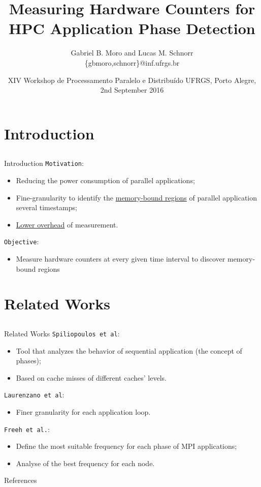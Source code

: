 \documentclass[12pt,xcolor=dvipsnames,presentation,handout]{beamer}
\institute{
\texttt{[image: img/gppd.png]}
\hfill
\texttt{[image: img/inf.pdf]}
\hfill
\texttt{[image: img/ufrgs.pdf]}
\hfill
\texttt{[image: img/hpe.png]}
}
\author{Gabriel B. Moro and Lucas M. Schnorr \\ \{gbmoro,schnorr\}@inf.ufrgs.br}
\date{XIV Workshop de Processamento Paralelo e Distribuído \linebreak UFRGS, Porto Alegre, 2nd September 2016}
\title{Measuring Hardware Counters for HPC Application Phase Detection}
\begin{document}
\maketitle

\newcommand{\prettysmall}[1]{\fontsize{#1}{#1}\selectfont}

\section{Introduction}
\label{sec:orgheadline3}
\subsection{}
\label{sec:orgheadline2}
\begin{frame}[fragile,label={sec:orgheadline1}]{Introduction}
 \texttt{Motivation}:

\begin{itemize}
\item Reducing the power consumption of parallel applications;
\item Fine-granularity to identify the \uline{memory-bound regions} of parallel
application several timestamps;
\item \uline{Lower overhead} of measurement.
\end{itemize}

\texttt{Objective}:

\begin{itemize}
\item Measure hardware counters at every given time interval to discover
memory-bound regions
\end{itemize}
\end{frame}

\section{Related Works}
\label{sec:orgheadline7}
\subsection{}
\label{sec:orgheadline6}
\begin{frame}[fragile,label={sec:orgheadline4}]{Related Works}
 \texttt{Spiliopoulos et al}:
\begin{itemize}
\item Tool that analyzes the behavior of sequential application (the
concept of phases);
\item Based on cache misses of different caches' levels.
\end{itemize}

\texttt{Laurenzano et al}: 
\begin{itemize}
\item Finer granularity for each application loop.
\end{itemize}

\texttt{Freeh et al.}:
\begin{itemize}
\item Define the most suitable frequency for each phase of MPI
applications;
\item Analyse of the best frequency for each node.
\end{itemize}
\end{frame}


\begin{frame}[label={sec:orgheadline5}]{References}
\tiny


\end{frame}
\end{document}
